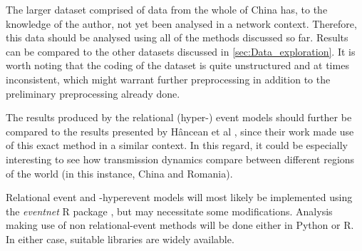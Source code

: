 \documentclass{article}
\begin{document}
	The larger dataset comprised of data from the whole of China has, to the knowledge of the author, not yet been analysed in a network context. Therefore, this data should be analysed using all of the methods discussed so far. Results can be compared to the other datasets discussed in \ref{sec:Data_exploration}. It is worth noting that the coding of the dataset is quite unstructured and at times inconsistent, which might warrant further preprocessing in addition to the preliminary preprocessing already done.
	
	The results produced by the relational (hyper-) event models should further be compared to the results presented by Hâncean et al \cite{hancean2022occupations}, since their work made use of this exact method in a similar context. In this regard, it could be especially interesting to see how transmission dynamics compare between different regions of the world (in this instance, China and Romania). 
	
	Relational event and -hyperevent models will most likely be implemented using the \emph{eventnet} R package \cite{eventnet}, but may necessitate some modifications. Analysis making use of non relational-event methods will be done either in Python or R. In either case, suitable libraries are widely available.
	
	\printbibliography
\end{document}
